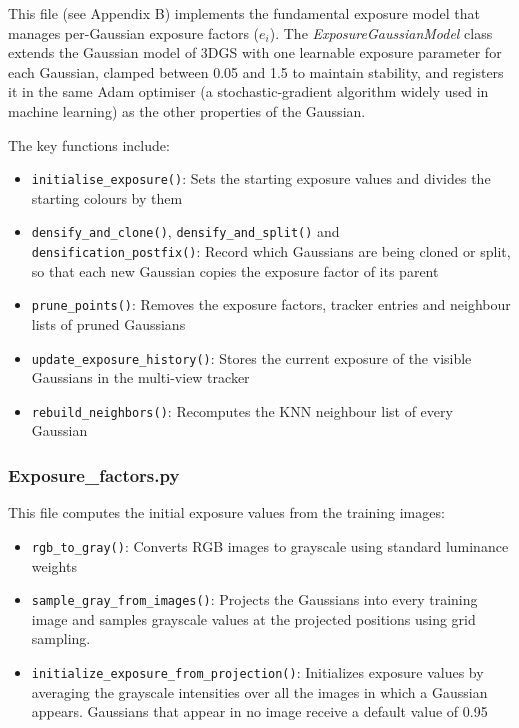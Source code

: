 \documentclass[11pt,a4paper]{article}
\begin{document}
This file (see Appendix B) implements the fundamental exposure model that manages per-Gaussian exposure factors ($e_i$). The \textit{ExposureGaussianModel} class extends the Gaussian model of 3DGS with one learnable exposure parameter for each Gaussian, clamped between 0.05 and 1.5 to maintain stability, and registers it in the same Adam optimiser (a stochastic-gradient algorithm widely used in machine learning) \cite{ref16} as the other properties of the Gaussian.

The key functions include:

\begin{itemize}
\item \texttt{initialise\_exposure()}: Sets the starting exposure values and divides the starting colours by them
\item \texttt{densify\_and\_clone()}, \texttt{densify\_and\_split()} and \texttt{densification\_postfix()}: Record which Gaussians are being cloned or split, so that each new Gaussian copies the exposure factor of its parent
\item \texttt{prune\_points()}: Removes the exposure factors, tracker entries and neighbour lists of pruned Gaussians
\item \texttt{update\_exposure\_history()}: Stores the current exposure of the visible Gaussians in the multi-view tracker
\item \texttt{rebuild\_neighbors()}: Recomputes the KNN neighbour list of every Gaussian
\end{itemize}

\subsubsection{Exposure\_factors.py}

This file computes the initial exposure values from the training images:

\begin{itemize}
\item \texttt{rgb\_to\_gray()}: Converts RGB images to grayscale using standard luminance weights
\item \texttt{sample\_gray\_from\_images()}: Projects the Gaussians into every training image and samples grayscale values at the projected positions using grid sampling.
\item \texttt{initialize\_exposure\_from\_projection()}: Initializes exposure values by averaging the grayscale intensities over all the images in which a Gaussian appears. Gaussians that appear in no image receive a default value of 0.95
\end{itemize}
\end{document}
